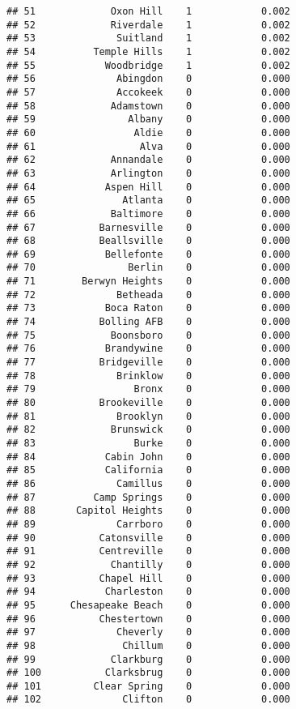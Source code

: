 \documentclass[]{article}
\begin{document}
\begin{verbatim}
## 51             Oxon Hill    1            0.002
## 52             Riverdale    1            0.002
## 53              Suitland    1            0.002
## 54          Temple Hills    1            0.002
## 55            Woodbridge    1            0.002
## 56              Abingdon    0            0.000
## 57              Accokeek    0            0.000
## 58             Adamstown    0            0.000
## 59                Albany    0            0.000
## 60                 Aldie    0            0.000
## 61                  Alva    0            0.000
## 62             Annandale    0            0.000
## 63             Arlington    0            0.000
## 64            Aspen Hill    0            0.000
## 65               Atlanta    0            0.000
## 66             Baltimore    0            0.000
## 67           Barnesville    0            0.000
## 68           Beallsville    0            0.000
## 69            Bellefonte    0            0.000
## 70                Berlin    0            0.000
## 71        Berwyn Heights    0            0.000
## 72              Betheada    0            0.000
## 73            Boca Raton    0            0.000
## 74           Bolling AFB    0            0.000
## 75             Boonsboro    0            0.000
## 76            Brandywine    0            0.000
## 77           Bridgeville    0            0.000
## 78              Brinklow    0            0.000
## 79                 Bronx    0            0.000
## 80           Brookeville    0            0.000
## 81              Brooklyn    0            0.000
## 82             Brunswick    0            0.000
## 83                 Burke    0            0.000
## 84            Cabin John    0            0.000
## 85            California    0            0.000
## 86              Camillus    0            0.000
## 87          Camp Springs    0            0.000
## 88       Capitol Heights    0            0.000
## 89              Carrboro    0            0.000
## 90           Catonsville    0            0.000
## 91           Centreville    0            0.000
## 92             Chantilly    0            0.000
## 93           Chapel Hill    0            0.000
## 94            Charleston    0            0.000
## 95      Chesapeake Beach    0            0.000
## 96           Chestertown    0            0.000
## 97              Cheverly    0            0.000
## 98               Chillum    0            0.000
## 99             Clarkburg    0            0.000
## 100           Clarksbrug    0            0.000
## 101         Clear Spring    0            0.000
## 102              Clifton    0            0.000

\end{verbatim}
\end{document}
